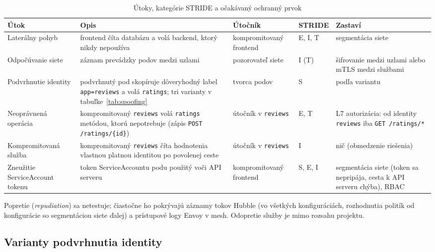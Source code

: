 \begin{table}[ht!]
  \centering
  \caption{Útoky, kategórie STRIDE a očakávaný ochranný prvok}
  \label{tab:attacks}
  \footnotesize
  \renewcommand{\arraystretch}{1.15}
  \begin{tabularx}{\textwidth}{@{}>{\raggedright\arraybackslash}p{2.7cm}>{\raggedright\arraybackslash}X>{\raggedright\arraybackslash}p{2.7cm}>{\raggedright\arraybackslash}p{1.4cm}>{\raggedright\arraybackslash}p{2.6cm}@{}}
    \toprule
    Útok & Opis & Útočník & STRIDE & Zastaví \\
    \midrule
    Laterálny pohyb & frontend číta databázu a volá backend, ktorý nikdy nepoužíva & kompromitovaný frontend & E, I, T & segmentácia siete \\
    Odpočúvanie siete & záznam prevádzky podov medzi uzlami & pozorovateľ siete & I (T) & šifrovanie medzi uzlami alebo mTLS medzi službami \\
    Podvrhnutie identity & podvrhnutý pod skopíruje dôveryhodný label \texttt{app=reviews} a volá \texttt{ratings}; tri varianty v tabuľke~\ref{tab:spoofing} & tvorca podov & S & podľa variantu \\
    Neoprávnená operácia & kompromitovaný \texttt{reviews} volá \texttt{ratings} metódou, ktorú nepotrebuje (zápis \texttt{POST /ratings/\{id\}}) & útočník v \texttt{reviews} & E, T & L7 autorizácia: od identity \texttt{reviews} iba \texttt{GET /ratings/*} \\
    Kompromitovaná služba & kompromitovaný \texttt{reviews} číta hodnotenia vlastnou platnou identitou po povolenej ceste & útočník v \texttt{reviews} & I & nič (obmedzenie riešenia) \\
    Zneužitie ServiceAccount tokenu & token ServiceAccountu podu použitý voči API serveru & kompromitovaný frontend & S, E, I & segmentácia siete (token sa nepripája, cesta k API serveru chýba), RBAC \\
    \bottomrule
  \end{tabularx}
\end{table}

Popretie (\emph{repudiation}) sa netestuje; čiastočne ho pokrývajú záznamy tokov Hubble (vo všetkých konfiguráciách, rozhodnutia politík od konfigurácie so segmentáciou siete ďalej) a prístupové logy Envoy v mesh. Odopretie služby je mimo rozsahu projektu.

\subsection{Varianty podvrhnutia identity}

